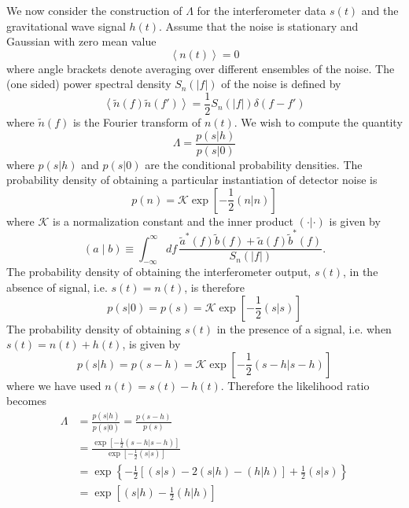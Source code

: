 We now consider the construction of $\Lambda$ for the interferometer data
$s(t)$ and the gravitational wave signal $h(t)$. Assume that the noise
is stationary and Gaussian with zero mean value
\begin{equation}
\left\langle n(t) \right\rangle = 0
\end{equation}
where angle brackets denote averaging over different ensembles of the
noise. The  (one sided) power spectral density $S_n(|f|)$ of the noise is
defined by
\begin{equation}
\left\langle \tilde{n}(f) \tilde{n}(f') \right\rangle = \frac{1}{2} S_n(|f|)
\delta(f-f')
\label{eq:ospsddef}
\end{equation}
where $\tilde{n}(f)$ is the Fourier transform of $n(t)$. We wish to compute
the quantity
\begin{equation}
\Lambda = \frac{p(s|h)}{p(s|0)}
\end{equation}
where $p(s|h)$ and $p(s|0)$ are the conditional probability densities. The
probability density of obtaining a particular instantiation of detector noise
is\cite{Finn:1992wt}
\begin{equation}
p(n) = \mathcal{K} \exp\left[-\frac{1}{2} (n|n)\right]
\end{equation}
where $\mathcal{K}$ is a normalization constant and the inner product
$(\cdot|\cdot)$ is given by
\begin{equation}
\label{eq:fullinnerproduct}
  (a\mid b) \equiv \int_{-\infty}^\infty df\,
  \frac{\tilde{a}^\ast(f)\tilde{b}(f)+\tilde{a}(f)\tilde{b}^\ast(f)}
       {S_n(|f|)}.
\end{equation}
The probability density of obtaining the interferometer output, $s(t)$, in the
absence of signal, i.e. $s(t) = n(t)$, is therefore
\begin{equation}
p(s|0) = p(s) = \mathcal{K} \exp\left[-\frac{1}{2} (s|s)\right]
\end{equation}
The probability density of obtaining $s(t)$ in the presence of a signal, i.e.
when $s(t) = n(t) + h(t)$, is given by 
\begin{equation}
p(s|h) = p(s-h) = \mathcal{K} \exp\left[-\frac{1}{2} (s-h|s-h)\right]
\end{equation}
where we have used $n(t) = s(t) - h(t)$. Therefore the likelihood ratio
becomes
\begin{equation}
\begin{split}
\Lambda &= \frac{p(s|h)}{p(s|0)} = \frac{p(s-h)}{p(s)} \\
&= \frac{\exp\left[-\frac{1}{2} (s-h|s-h)\right]}{\exp\left[-\frac{1}{2} (s|s)\right]} \\
&= \exp\left\{-\frac{1}{2}\left[(s|s) - 2(s|h) - (h|h)\right] + \frac{1}{2}(s|s)\right\} \\
&= \exp\left[(s|h) - \frac{1}{2}(h|h)\right]
\label{eq:like1}
\end{split}
\end{equation}
